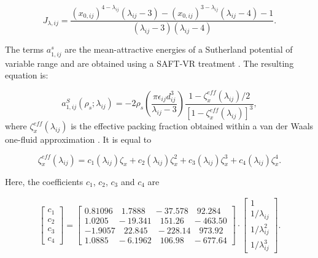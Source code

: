 \begin{equation}
J_{\lambda , ij} = \dfrac{ (x_{0,ij})^{4 - \lambda _{ij}}(\lambda _{ij} -3) - (x_{0,ij})^{3 - \lambda _{ij}}(\lambda _{ij} -4) -1}{(\lambda _{ij} -3)(\lambda _{ij} -4)}.
\end{equation}

The terms $a_{1,ij}^{s}$ are the mean-attractive energies of a Sutherland potential of variable range and are obtained using a SAFT-VR treatment \cite{doi:10.1021/jp306442b}.  The resulting equation is:

\begin{equation}
a_{1,ij}^{S} (\rho _{s} ; \lambda _{ij}) = -2 \rho _{s} \left(\dfrac{\pi \epsilon _{ij} d_{ij}^{3}}{\lambda _{ij} -3}\right) \dfrac{1 - \zeta _{x}^{eff}(\lambda _{ij})/2}{[1- \zeta _{x}^{eff}(\lambda _{ij})]^3},
\end{equation}
where $\zeta _{x}^{eff}(\lambda _{ij})$ is the effective packing fraction  obtained within a van der Waals one-fluid approximation \cite{lafitte2013}. It is equal to

\begin{equation}
\zeta _{x}^{eff}(\lambda _{ij}) = c_{1}(\lambda_{ij}) \zeta_{x} + c_{2}(\lambda_{ij}) \zeta_{x}^{2} + c_{3}(\lambda_{ij}) \zeta_{x}^3 + c_{4}(\lambda_{ij}) \zeta_{x}^4 . 
\end{equation}

Here, the coefficients $c_{1}$, $c_{2}$, $c_{3}$ and $c_{4}$ are 

\begin{equation}
\begin{aligned}
\left[ \begin{array}{c} c_{1} \\ c_{2} \\ c_{3} \\ c_{4} \end{array} \right] = 
\left[ \begin{array}{c} 0.81096 \quad 1.7888 \quad -37.578 \quad 92.284 \\ 1.0205 \quad -19.341 \quad 151.26 \quad -463.50 \\ -1.9057 \quad 22.845 \quad -228.14 \quad 973.92 \\ 1.0885 \quad  -6.1962 \quad 106.98 \quad -677.64 \end{array} \right] \cdot \left[ \begin{array}{c} 1 \\ 1/\lambda_{ij} \\ 1/\lambda_{ij}^{2} \\ 1/\lambda_{ij}^{3} \end{array} \right].
\end{aligned}
\end{equation}

